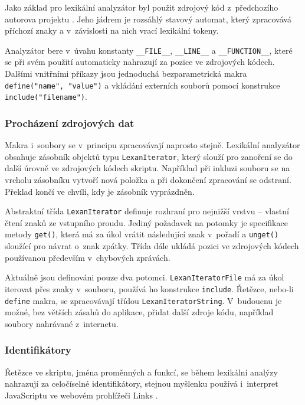\documentclass[11pt,twoside,a4paper]{book}
\begin{document}
Jako základ pro lexikální analyzátor byl použit zdrojový kód z~předchozího autorova projektu \cite[třída \texttt{CLexan}]{borsch}. Jeho jádrem je rozsáhlý stavový automat, který zpracovává příchozí znaky a v~závislosti na nich vrací lexikální tokeny.

Analyzátor bere v~úvahu konstanty \texttt{\_\_FILE\_\_}, \texttt{\_\_LINE\_\_} a \texttt{\_\_FUNCTION\_\_}, které se při svém použití automaticky nahrazují za pozice ve zdrojových kódech. Dalšími vnitřními příkazy jsou jednoduchá bezparametrická makra \texttt{define("name", "value")} a vkládání externích souborů pomocí konstrukce \texttt{include("filename")}.

\subsubsection{Procházení zdrojových dat}

Makra i~soubory se v~principu zpracovávají naprosto stejně. Lexikální analyzátor obsahuje zásobník objektů typu \texttt{LexanIterator}, který slouží pro zanoření se do další úrovně ve zdrojových kódech skriptu. Například při inkluzi souboru se na vrcholu zásobníku vytvoří nová položka a při dokončení zpracování se odstraní. Překlad končí ve chvíli, kdy je zásobník vyprázdněn.

Abstraktní třída \texttt{LexanIterator} definuje rozhraní pro nejnižší vrstvu -- vlastní čtení znaků ze vstupního proudu. Jediný požadavek na potomky je specifikace metody \texttt{get()}, která má za úkol vrátit následující znak v~pořadí a \texttt{unget()} sloužící pro návrat o~znak zpátky. Třída dále ukládá pozici ve zdrojových kódech používanou především v~chybových zprávách.

Aktuálně jsou definováni pouze dva potomci. \texttt{LexanIteratorFile} má za úkol iterovat přes znaky v~souboru, používá ho konstrukce \texttt{include}. Řetězce, nebo-li \texttt{define} makra, se zpracovávají třídou \texttt{Le\-xan\-Ite\-ra\-tor\-String}. V~budoucnu je možné, bez větších zásahů do aplikace, přidat další zdroje kódu, například soubory nahrávané z~internetu.


\subsubsection{Identifikátory}
\label{identifikatory}

Řetězce ve skriptu, jména proměnných a funkcí, se během lexikální analýzy nahrazují za celočíselné identifikátory, stejnou myšlenku používá i~interpret JavaScriptu ve webovém pro\-hlí\-že\-či Links \cite[str. 25]{links}.
\end{document}
